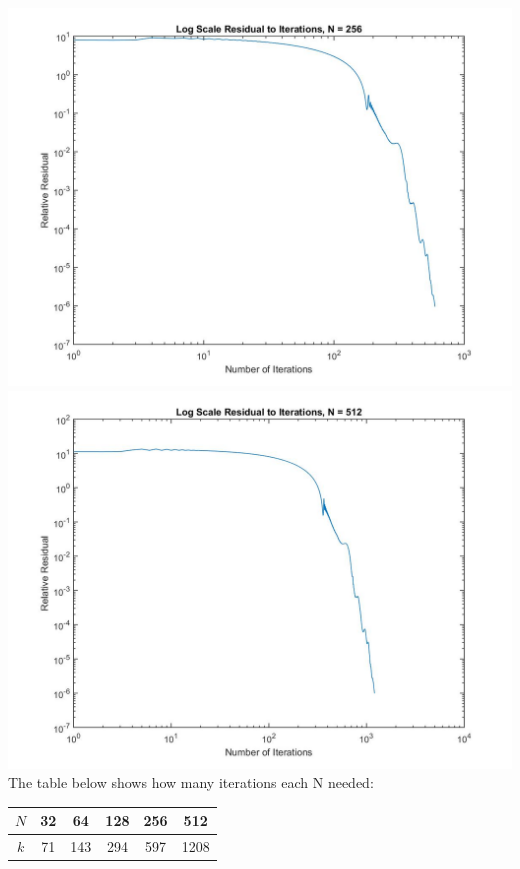 \documentclass[12pt]{article}
\begin{document}
\includegraphics[scale = 0.35]{logplotN-256.jpg} \\
\includegraphics[scale = 0.35]{logplotN-512.jpg} \\
The table below shows how many iterations each N needed:\\
\begin{center}
\begin{tabular}{|c||c|c|c|c|c|}
\hline
$N$ & 32 & 64 & 128 & 256 & 512 \\
\hline
$k$ & 71 & 143 & 294 & 597 & 1208 \\
\hline
\end{tabular}
\end{center}
\newpage
\end{document}
